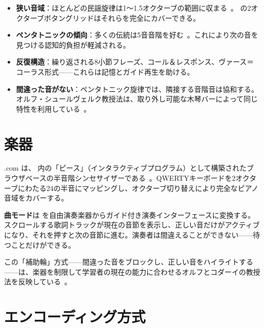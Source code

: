 \documentclass[11pt]{article}
\begin{document}
\begin{card}
\begin{itemize}
  \item \textbf{狭い音域}：ほとんどの民謡旋律は1〜1.5オクターブの範囲に収まる~\citep{lomax1968folk}。\np{} の2オクターブボタングリッドはそれらを完全にカバーできる。
  \item \textbf{ペンタトニックの傾向}：多くの伝統は5音音階を好む~\citep{kodaly1971folk}。これにより次の音を見つける認知的負担が軽減される。
  \item \textbf{反復構造}：繰り返される8小節フレーズ、コール＆レスポンス、ヴァース＝コーラス形式——これらは記憶とガイド再生を助ける。
  \item \textbf{間違った音がない}：ペンタトニック旋律では、隣接する音階音は協和する。オルフ・シュールヴェルク教授法は、取り外し可能な木琴バーによって同じ特性を利用している~\citep{orff1978schulwerk}。
\end{itemize}
\end{card}

\section{楽器}

\np{}.com は、\ac{} 内の「ピース」（インタラクティブプログラム）として構築されたブラウザベースの半音階シンセサイザーである~\citep{scudder2026ac, scudder2026notepat}。QWERTYキーボードを2オクターブにわたる24の半音にマッピングし、オクターブ切り替えにより完全なピアノ音域をカバーする。

\begin{darkcard}
\textbf{曲モード}は \np{} を自由演奏楽器からガイド付き演奏インターフェースに変換する。スクロールする歌詞トラックが現在の音節を表示し、正しい音だけがアクティブになり、それを押すと次の音節に進む。演奏者は間違えることができない——待つことだけができる。
\end{darkcard}

この「補助輪」方式——間違った音をブロックし、正しい音をハイライトする——は、楽器を制限して学習者の現在の能力に合わせるオルフとコダーイの教授法を反映している~\citep{kodaly1971folk, orff1978schulwerk}。

\section{エンコーディング方式}
\end{document}
